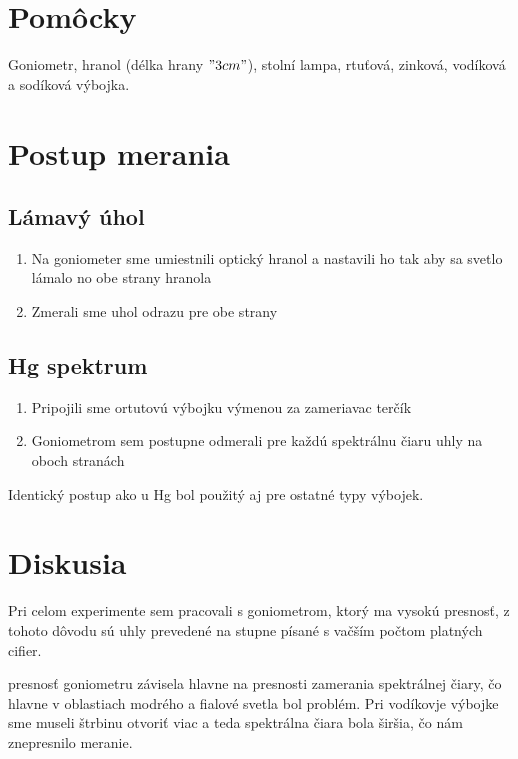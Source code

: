 \documentclass[10pt]{scrartcl}
\begin{document}
\MakeFJFIHead{}






\section{Pomôcky}
Goniometr, hranol (délka hrany $"3 cm"$), stolní lampa, rtuťová, zinková, vodíková a
sodíková výbojka.

\section{Postup merania}

\subsection{Lámavý úhol}

\begin{enumerate}
\item Na goniometer sme umiestnili optický hranol a nastavili ho tak aby sa svetlo lámalo no obe strany hranola
\item Zmerali sme uhol odrazu pre obe strany
\end{enumerate}

\subsection{Hg spektrum}
\begin{enumerate}
\item Pripojili sme ortutovú výbojku výmenou za zameriavac terčík
\item Goniometrom sem postupne odmerali pre každú spektrálnu čiaru uhly na oboch stranách
\end{enumerate}

Identický postup ako u Hg bol použitý aj pre ostatné typy výbojek.




\section{Diskusia}

Pri celom experimente sem pracovali s goniometrom, ktorý ma vysokú presnosť, z tohoto dôvodu sú uhly prevedené na stupne písané s vačším počtom platných cifier.

presnosť goniometru závisela hlavne na presnosti zamerania spektrálnej čiary, čo hlavne v oblastiach modrého a fialové svetla bol problém. Pri vodíkovje výbojke sme museli štrbinu otvoriť viac a teda spektrálna čiara bola širšia, čo nám znepresnilo meranie.
\end{document}
